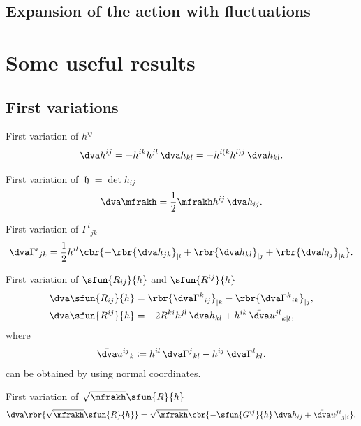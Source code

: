 \documentclass[a4paper,11pt]{article}
\begin{document}
\subsection{Expansion of the action with fluctuations}

\appendix

\section*{Some useful results}

\subsection*{First variations}

First variation of $h^{ij}$
\begin{align}
\dva h^{ij} = -h^{ik}h^{jl}\,\dva h_{kl} = - h^{i(k}h^{l)j}\,\dva h_{kl}.
\end{align}

First variation of $\mfrakh = \det h_{ij}$
\begin{align}
\dva \mfrakh = \frac{1}{2} \mfrakh h^{ij}\,\dva h_{ij}.
\end{align}

First variation of $\Gamma^i{}_{jk}$
\begin{align}
\dva \Gamma^{i}{}_{jk} = \frac{1}{2} h^{il}
\cbr{-\rbr{\dva h_{jk}}_{|l} + \rbr{\dva h_{kl}}_{|j} + \rbr{\dva h_{lj}}_{|k}}.
\end{align}

First variation of $\sfun{R_{ij}}{h}$ and $\sfun{R^{ij}}{h}$
\begin{align}
\dva \sfun{R_{ij}}{h} &=
\rbr{\dva\Gamma^k{}_{ij}}_{|k} - \rbr{\dva\Gamma^k{}_{ik}}_{|j},
\label{eq:var-R_{ij}}
\\
\dva \sfun{R^{ij}}{h} &=
-2R^{ki}h^{jl}\,\dva h_{kl} + h^{ik}\,\bar{\dva}u^{jl}{}_{k|l},
\end{align}
where
\begin{align}
\bar{\dva}u^{ij}{}_{k} \coloneqq
h^{il}\,\dva\Gamma^{j}{}_{kl} - h^{ij}\,\dva\Gamma^{l}{}_{kl}.
\end{align}
 can be obtained by using normal coordinates.

First variation of $\sqrt{\mfrakh}\sfun{R}{h}$
\begin{align}
\dva\rbr{\sqrt{\mfrakh}\sfun{R}{h}} = \sqrt{\mfrakh}
\cbr{-\sfun{G^{ij}}{h}\,\dva h_{ij} +
\bar{\dva}u^{ji}{}_{j|i}}.
\end{align}
\end{document}
